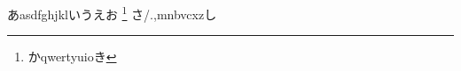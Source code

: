 \documentclass{ltjarticle}
\begin{document}
あasdfghjklいうえお
\footnote{\ifdefined\directlua\else\yoko\fi かqwertyuioき}%
さ/.,mnbvcxzし
\end{document}
